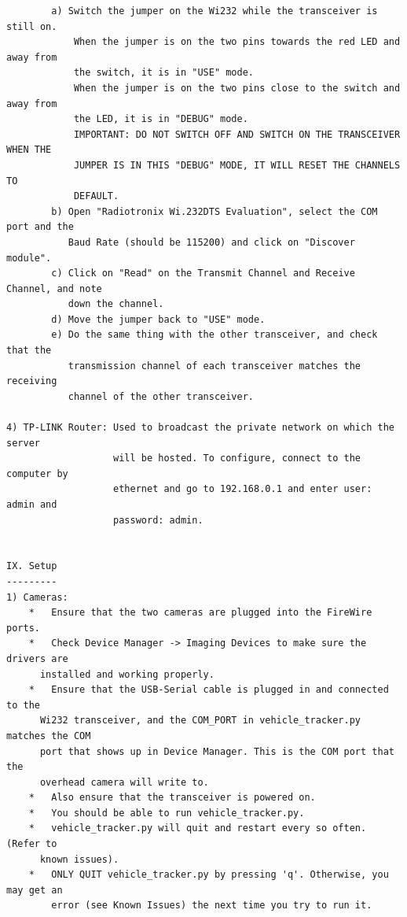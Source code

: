 \documentclass[english]{article}\usepackage[]{graphicx}\usepackage[]{color}
\begin{document}
\begin{verbatim}
   		a) Switch the jumper on the Wi232 while the transceiver is still on.
   			When the jumper is on the two pins towards the red LED and away from
   			the switch, it is in "USE" mode.
   			When the jumper is on the two pins close to the switch and away from
   			the LED, it is in "DEBUG" mode.
   			IMPORTANT: DO NOT SWITCH OFF AND SWITCH ON THE TRANSCEIVER WHEN THE
   			JUMPER IS IN THIS "DEBUG" MODE, IT WILL RESET THE CHANNELS TO
   			DEFAULT.
   		b) Open "Radiotronix Wi.232DTS Evaluation", select the COM port and the
   		   Baud Rate (should be 115200) and click on "Discover module".
   		c) Click on "Read" on the Transmit Channel and Receive Channel, and note
   		   down the channel.
   		d) Move the jumper back to "USE" mode.
   		e) Do the same thing with the other transceiver, and check that the
   		   transmission channel of each transceiver matches the receiving
   		   channel of the other transceiver.

4) TP-LINK Router: Used to broadcast the private network on which the server
				   will be hosted. To configure, connect to the computer by
				   ethernet and go to 192.168.0.1 and enter user: admin and
				   password: admin.


IX. Setup
---------
1) Cameras:
	*   Ensure that the two cameras are plugged into the FireWire ports.
	*   Check Device Manager -> Imaging Devices to make sure the drivers are
	  installed and working properly.
	*   Ensure that the USB-Serial cable is plugged in and connected to the
	  Wi232 transceiver, and the COM_PORT in vehicle_tracker.py matches the COM
	  port that shows up in Device Manager. This is the COM port that the
	  overhead camera will write to.
	*   Also ensure that the transceiver is powered on.
	*   You should be able to run vehicle_tracker.py.
	*   vehicle_tracker.py will quit and restart every so often. (Refer to 
	  known issues).
	*	ONLY QUIT vehicle_tracker.py by pressing 'q'. Otherwise, you may get an
		error (see Known Issues) the next time you try to run it.


\end{verbatim}
\end{document}
